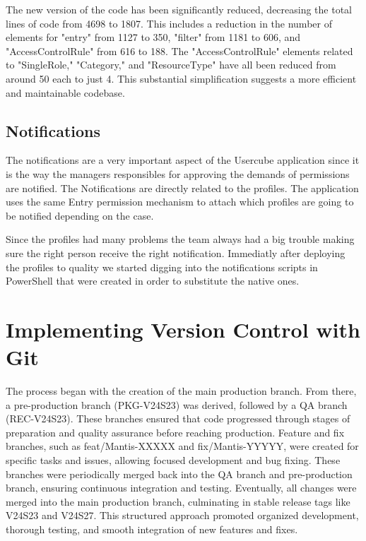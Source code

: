 The new version of the code has been significantly reduced, decreasing the total lines of code from 4698 to 1807. This includes a reduction in the number of elements for "entry" from 1127 to 350, "filter" from 1181 to 606, and "AccessControlRule" from 616 to 188. The "AccessControlRule" elements related to "SingleRole," "Category," and "ResourceType" have all been reduced from around 50 each to just 4. This substantial simplification suggests a more efficient and maintainable codebase.

\subsection{Notifications}

The notifications are a very important aspect of the Usercube application since it is the way the managers responsibles for approving the demands of permissions are notified. The Notifications are directly related to the profiles. The application uses the same Entry permission mechanism to attach which profiles are going to be notified depending on the case.

Since the profiles had many problems the team always had a big trouble making sure the right person receive the right notification. Immediatly after deploying the profiles to quality we started digging into the notifications scripts in PowerShell that were created in order to substitute the native ones.

\section{Implementing Version Control with Git}

The process began with the creation of the main production branch. From there, a pre-production branch (PKG-V24S23) was derived, followed by a QA branch (REC-V24S23). These branches ensured that code progressed through stages of preparation and quality assurance before reaching production. Feature and fix branches, such as feat/Mantis-XXXXX and fix/Mantis-YYYYY, were created for specific tasks and issues, allowing focused development and bug fixing. These branches were periodically merged back into the QA branch and pre-production branch, ensuring continuous integration and testing. Eventually, all changes were merged into the main production branch, culminating in stable release tags like V24S23 and V24S27. This structured approach promoted organized development, thorough testing, and smooth integration of new features and fixes.

